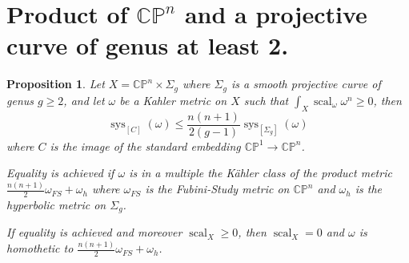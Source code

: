 \documentclass{amsart}
\newtheorem{proposition}[theorem]{Proposition}
\numberwithin{equation}{section}
\theoremstyle{definition}
\DeclareMathOperator{\scal}{scal}
\DeclareMathOperator{\sys}{sys}
\begin{document}
\section{Product of $\mathbb{CP}^n$ and a projective curve of genus at least 2.}

\begin{proposition}
Let $X=\mathbb{CP}^n\times \Sigma_g$ where $\Sigma_g$ is a smooth projective curve of genus $g\geq 2$, and let $\omega$ be a Kahler metric on $X$ such that $\int_X\scal_\omega\omega^n\geq 0$, then \[\sys_{[C]}(\omega)\leq \frac{n(n+1)}{2(g-1)}\sys_{[\Sigma_g]}(\omega)\] where $C$ is the image of the standard embedding $\mathbb{CP}^1\to\mathbb{CP}^n$.

Equality is achieved if $\omega$ is in a multiple the K\"ahler class of the product metric $\frac{n(n+1)}{2}\omega_{FS}+\omega_h$ where $\omega_{FS}$ is the Fubini-Study metric on $\mathbb{CP}^n$ and $\omega_h$ is the hyperbolic metric on $\Sigma_g$.

If equality is achieved and moreover $\scal_X\geq 0$, then $\scal_X=0$ and $\omega$ is homothetic to $\frac{n(n+1)}{2}\omega_{FS}+\omega_h$.
\end{proposition}
\end{document}
